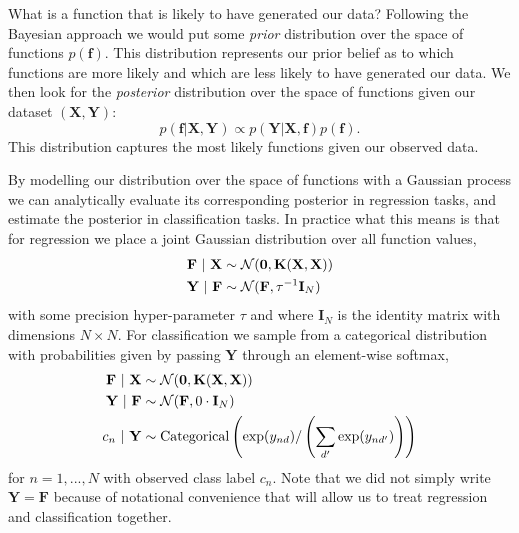 \documentclass{article} %
\newcommand{\N}{\mathcal{N}}
\newcommand{\svert}{~|~}
\newcommand{\f}{\mathbf{f}}
\newcommand{\X}{\mathbf{X}}
\newcommand{\Y}{\mathbf{Y}}
\newcommand{\F}{\mathbf{F}}
\newcommand{\I}{\mathbf{I}}
\newcommand{\bz}{\mathbf{0}}
\newcommand{\K}{\mathbf{K}}
\theoremstyle{definition}
\begin{document}
What is a function that is likely to have generated our data? Following the Bayesian approach we would put some \textit{prior} distribution over the space of functions $p(\f)$. This distribution represents our prior belief as to which functions are more likely and which are less likely to have generated our data. We then look for the \textit{posterior} distribution over the space of functions given our dataset $(\X, \Y)$:
$$
p(\f | \X, \Y) \propto p(\Y | \X, \f) p(\f).
$$
This distribution captures the most likely functions given our observed data.

By modelling our distribution over the space of functions with a Gaussian process we can analytically evaluate its corresponding posterior in regression tasks, and estimate the posterior in classification tasks. 
In practice what this means is that for regression we place a joint Gaussian distribution over all function values,
\begin{align} \label{eq:generative_model_reg}
\F \svert \X &\sim \N(\bz, \K(\X, \X)) \\
\Y \svert \F &\sim \N(\F, \tau^{-1} \I_N) \notag
\end{align}
with some precision hyper-parameter $\tau$ and where $\I_N$ is the identity matrix with dimensions $N \times N$. For classification we sample from a categorical distribution with probabilities given by passing $\Y$ through an element-wise softmax, 
\begin{align} \label{eq:generative_model_class}
\F \svert \X &\sim \N(\bz, \K(\X, \X)) \\
\Y \svert \F &\sim \N(\F, 0 \cdot \I_N) \notag\\
c_n \svert \Y &\sim \text{Categorical}\left( \exp(y_{nd}) / \left(\sum_{d'} \exp(y_{nd'})\right) \right) \notag
\end{align}
for $n = 1, ..., N$ with observed class label $c_n$. Note that we did not simply write $\Y = \F$ because of notational convenience that will allow us to treat regression and classification together.
\end{document}
